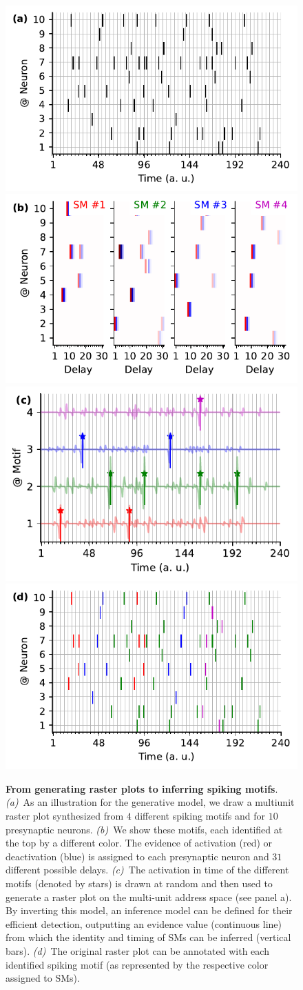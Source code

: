 \documentclass[runningheads]{llncs}
\begin{document}
\begin{figure}%
  \includegraphics[width=.50\linewidth]{figures/THC_toy-a_k.pdf}
  \includegraphics[width=.50\linewidth]{figures/THC_toy-b.pdf}
  \\
  \includegraphics[width=.50\linewidth]{figures/THC_toy-c.pdf}
  \includegraphics[width=.50\linewidth]{figures/THC_toy-a.pdf} 
\caption{\textbf{From generating raster plots to inferring spiking motifs}. \textit{(a)}~As an illustration for the generative model, we draw a multiunit raster plot synthesized from $4$ different spiking motifs and for $10$ presynaptic neurons. \textit{(b)}~We show these motifs, each identified at the top by a different color. The evidence of activation (red) or deactivation (blue) is assigned to each presynaptic neuron and $31$ different possible delays. \textit{(c)}~The activation in time of the different motifs (denoted by stars) is drawn at random and then used to generate a raster plot on the multi-unit address space (see panel a). By inverting this model, an inference model can be defined for their efficient detection, outputting an evidence value (continuous line) from which the identity and timing of SMs can be inferred (vertical bars). \textit{(d)}~The original raster plot can be annotated with each identified spiking motif (as represented by the respective color assigned to SMs).
}
\label{fig:THC}
\end{figure}
\end{document}
